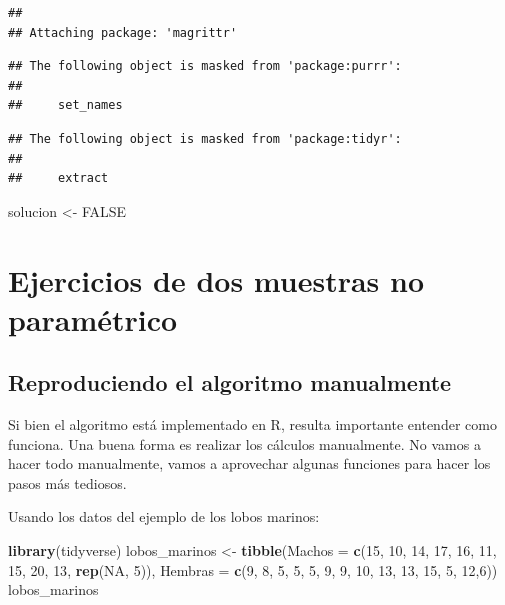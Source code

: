 \documentclass[]{book}
\newenvironment{Shaded}{\begin{snugshade}}{\end{snugshade}}
\newcommand{\DataTypeTok}[1]{\textcolor[rgb]{0.13,0.29,0.53}{#1}}
\newcommand{\DecValTok}[1]{\textcolor[rgb]{0.00,0.00,0.81}{#1}}
\newcommand{\KeywordTok}[1]{\textcolor[rgb]{0.13,0.29,0.53}{\textbf{#1}}}
\newcommand{\NormalTok}[1]{#1}
\newcommand{\OtherTok}[1]{\textcolor[rgb]{0.56,0.35,0.01}{#1}}
\newcommand{\StringTok}[1]{\textcolor[rgb]{0.31,0.60,0.02}{#1}}
\theoremstyle{definition}
\theoremstyle{definition}
\theoremstyle{definition}
\theoremstyle{remark}
\begin{document}
\begin{verbatim}
## 
## Attaching package: 'magrittr'
\end{verbatim}

\begin{verbatim}
## The following object is masked from 'package:purrr':
## 
##     set_names
\end{verbatim}

\begin{verbatim}
## The following object is masked from 'package:tidyr':
## 
##     extract
\end{verbatim}

\begin{Shaded}
\begin{Highlighting}[]
\NormalTok{solucion <-}\StringTok{ }\OtherTok{FALSE}
\end{Highlighting}
\end{Shaded}

\hypertarget{ejercicios-de-dos-muestras-no-parametrico}{%
\chapter{Ejercicios de dos muestras no
paramétrico}\label{ejercicios-de-dos-muestras-no-parametrico}}

\hypertarget{reproduciendo-el-algoritmo-manualmente}{%
\section{Reproduciendo el algoritmo
manualmente}\label{reproduciendo-el-algoritmo-manualmente}}

Si bien el algoritmo está implementado en R, resulta importante entender
como funciona. Una buena forma es realizar los cálculos manualmente. No
vamos a hacer todo manualmente, vamos a aprovechar algunas funciones
para hacer los pasos más tediosos.

Usando los datos del ejemplo de los lobos marinos:

\begin{Shaded}
\begin{Highlighting}[]
\KeywordTok{library}\NormalTok{(tidyverse)}
\NormalTok{lobos_marinos <-}\StringTok{ }\KeywordTok{tibble}\NormalTok{(}\DataTypeTok{Machos =} \KeywordTok{c}\NormalTok{(}\DecValTok{15}\NormalTok{, }\DecValTok{10}\NormalTok{, }\DecValTok{14}\NormalTok{, }\DecValTok{17}\NormalTok{, }\DecValTok{16}\NormalTok{, }\DecValTok{11}\NormalTok{, }\DecValTok{15}\NormalTok{, }\DecValTok{20}\NormalTok{, }\DecValTok{13}\NormalTok{, }\KeywordTok{rep}\NormalTok{(}\OtherTok{NA}\NormalTok{, }\DecValTok{5}\NormalTok{)),}
           \DataTypeTok{Hembras =} \KeywordTok{c}\NormalTok{(}\DecValTok{9}\NormalTok{, }\DecValTok{8}\NormalTok{, }\DecValTok{5}\NormalTok{, }\DecValTok{5}\NormalTok{, }\DecValTok{5}\NormalTok{, }\DecValTok{9}\NormalTok{, }\DecValTok{9}\NormalTok{, }\DecValTok{10}\NormalTok{, }\DecValTok{13}\NormalTok{, }\DecValTok{13}\NormalTok{, }\DecValTok{15}\NormalTok{, }\DecValTok{5}\NormalTok{, }\DecValTok{12}\NormalTok{,}\DecValTok{6}\NormalTok{))}
\NormalTok{lobos_marinos}
\end{Highlighting}
\end{Shaded}
\end{document}
